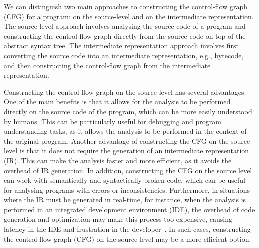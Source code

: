 We can distinguish two main approaches to constructing the control-flow graph (CFG) for a program:
on the source-level and on the intermediate representation. The source-level approach
involves analysing the source code of a program and constructing the control-flow graph
directly from the source code on top of the abstract syntax tree. The intermediate representation approach involves
first converting the source code into an intermediate representation, e.g., bytecode,
and then constructing the control-flow graph from the intermediate representation.

Constructing the control-flow graph on the source level has several advantages.
One of the main benefits is that it allows for the analysis to be performed directly
on the source code of the program, which can be more easily understood by humans.
This can be particularly useful for debugging and program understanding tasks,
as it allows the analysis to be performed in the context of the original program.
Another advantage of constructing the CFG on the source level is that it does not
require the generation of an intermediate representation (IR). This can make the
analysis faster and more efficient, as it avoids the overhead of IR generation.
In addition, constructing the CFG on the source level can work with semantically
and syntactically broken code, which can be useful for analysing programs with
errors or inconsistencies.
Furthermore, in situations where the IR must be generated in real-time,
for instance, when the analysis is performed in an integrated development environment (IDE),
the overhead of code generation and optimization may make this process too expensive,
causing latency in the IDE and frustration in the developer~\cite{piskachev2022far}.
In such cases, constructing the control-flow graph (CFG) on the source level
may be a more efficient option.

